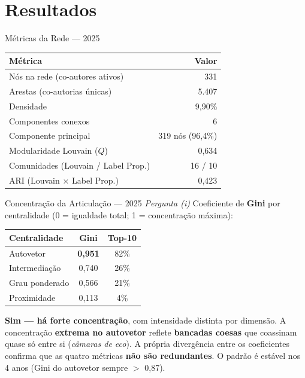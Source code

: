 \documentclass{beamer}
\begin{document}
\section{Resultados}

\begin{frame}{Métricas da Rede — 2025}
\begin{table}
\centering
\small
\begin{tabular}{lr}
\toprule
\textbf{Métrica} & \textbf{Valor} \\
\midrule
Nós na rede (co-autores ativos) & 331  \\
Arestas (co-autorias únicas)    & 5.407  \\
Densidade                       & 9,90\% \\
Componentes conexos             & 6 \\
Componente principal            & 319 nós (96,4\%) \\
Modularidade Louvain ($Q$)      & 0,634 \\
Comunidades (Louvain / Label Prop.) & 16 / 10 \\
ARI (Louvain $\times$ Label Prop.)  & 0,423 \\
\bottomrule
\end{tabular}
\end{table}
\end{frame}

\begin{frame}{Concentração da Articulação — 2025 \hfill {\footnotesize\textit{Pergunta (i)}}}
Coeficiente de \textbf{Gini} por centralidade (0 = igualdade total; 1 = concentração máxima):

\begin{table}
\centering
\small
\begin{tabular}{lcc}
\toprule
\textbf{Centralidade} & \textbf{Gini} & \textbf{Top-10} \\
\midrule
Autovetor      & \textbf{0,951} & 82\% \\
Intermediação  & 0,740 & 26\% \\
Grau ponderado & 0,566 & 21\% \\
Proximidade    & 0,113 & \phantom{0}4\% \\
\bottomrule
\end{tabular}
\end{table}

\footnotesize
\textbf{Sim — há forte concentração}, com intensidade distinta por dimensão. A concentração \textbf{extrema no autovetor} reflete \textbf{bancadas coesas} que coassinam quase só entre si (\textit{câmaras de eco}). A própria divergência entre os coeficientes confirma que as quatro métricas \textbf{não são redundantes}. O padrão é estável nos 4 anos (Gini do autovetor sempre $>$ 0,87).
\end{frame}
\end{document}
